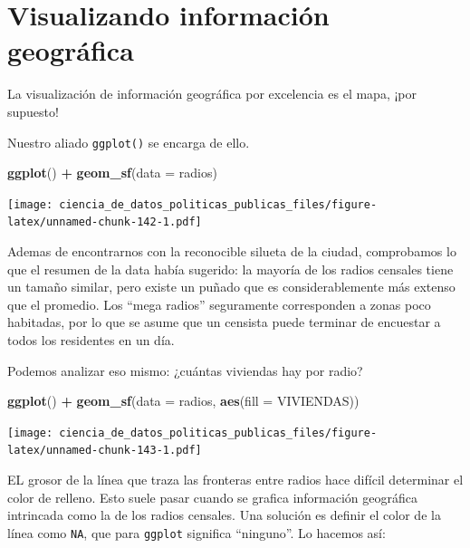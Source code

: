 \documentclass[]{book}
\newenvironment{Shaded}{\begin{snugshade}}{\end{snugshade}}
\newcommand{\KeywordTok}[1]{\textcolor[rgb]{0.13,0.29,0.53}{\textbf{#1}}}
\newcommand{\DataTypeTok}[1]{\textcolor[rgb]{0.13,0.29,0.53}{#1}}
\newcommand{\StringTok}[1]{\textcolor[rgb]{0.31,0.60,0.02}{#1}}
\newcommand{\OperatorTok}[1]{\textcolor[rgb]{0.81,0.36,0.00}{\textbf{#1}}}
\newcommand{\NormalTok}[1]{#1}
\begin{document}
\section{Visualizando información
geográfica}\label{visualizando-informacion-geografica}

La visualización de información geográfica por excelencia es el mapa,
¡por supuesto!

Nuestro aliado \texttt{ggplot()} se encarga de ello.

\begin{Shaded}
\begin{Highlighting}[]
\KeywordTok{ggplot}\NormalTok{() }\OperatorTok{+}\StringTok{ }\KeywordTok{geom_sf}\NormalTok{(}\DataTypeTok{data =}\NormalTok{ radios)}
\end{Highlighting}
\end{Shaded}

\texttt{[image: ciencia\_de\_datos\_politicas\_publicas\_files/figure-latex/unnamed-chunk-142-1.pdf]}

Ademas de encontrarnos con la reconocible silueta de la ciudad,
comprobamos lo que el resumen de la data había sugerido: la mayoría de
los radios censales tiene un tamaño similar, pero existe un puñado que
es considerablemente más extenso que el promedio. Los ``mega radios''
seguramente corresponden a zonas poco habitadas, por lo que se asume que
un censista puede terminar de encuestar a todos los residentes en un
día.

Podemos analizar eso mismo: ¿cuántas viviendas hay por radio?

\begin{Shaded}
\begin{Highlighting}[]
\KeywordTok{ggplot}\NormalTok{() }\OperatorTok{+}\StringTok{ }\KeywordTok{geom_sf}\NormalTok{(}\DataTypeTok{data =}\NormalTok{ radios, }\KeywordTok{aes}\NormalTok{(}\DataTypeTok{fill =}\NormalTok{ VIVIENDAS)) }
\end{Highlighting}
\end{Shaded}

\texttt{[image: ciencia\_de\_datos\_politicas\_publicas\_files/figure-latex/unnamed-chunk-143-1.pdf]}

EL grosor de la línea que traza las fronteras entre radios hace difícil
determinar el color de relleno. Esto suele pasar cuando se grafica
información geográfica intrincada como la de los radios censales. Una
solución es definir el color de la línea como \texttt{NA}, que para
\texttt{ggplot} significa ``ninguno''. Lo hacemos así:
\end{document}
